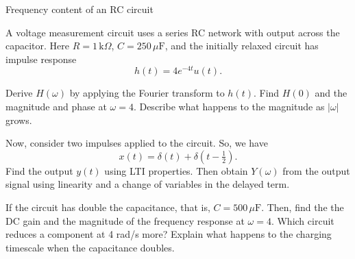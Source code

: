 \documentclass{ee102_pset}
\begin{document}
 Frequency content of an RC circuit

A voltage measurement circuit uses a series RC network with output across
the capacitor. Here $R=1\,\mathrm{k}\Omega$, $C=250\,\mu\mathrm F$,
and the initially relaxed circuit has impulse response
\[
h(t)=4e^{-4t}u(t).
\]

\problempart[8 points] Derive $H(\omega)$ by applying the Fourier
transform to $h(t)$. Find $H(0)$ and the magnitude and phase at
$\omega=4$. Describe what happens to the magnitude as $|\omega|$ grows.


\problempart[8 points] Now, consider two impulses applied to the circuit. So, we have
\[
x(t)=\delta(t)+\delta(t-\tfrac12).
\]
Find the output $y(t)$ using LTI properties. Then obtain $Y(\omega)$
from the output signal using linearity and a change of variables in the
delayed term. 

\problempart[4 points] If the circuit has double the capacitance, that is,  $C = 500\,\mu\mathrm F$.
Then, find the the DC gain and the magnitude of the
frequency response at $\omega=4$. Which circuit reduces a component at
4 rad/s more? Explain what happens to the charging timescale when
the capacitance doubles.
\end{document}
